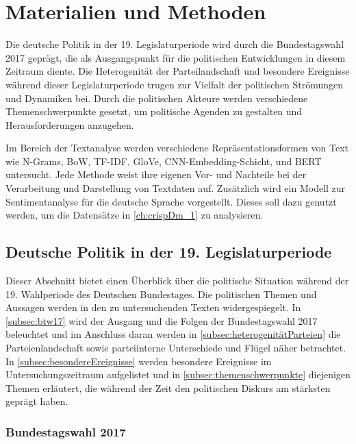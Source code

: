 
\chapter{Materialien und Methoden} \label{ch:materialsAndMethods}

Die deutsche Politik in der 19. Legislaturperiode wird durch die Bundestagswahl 2017 geprägt, die als Ausgangspunkt für die politischen Entwicklungen in diesem Zeitraum diente. Die Heterogenität der Parteilandschaft und besondere Ereignisse während dieser Legislaturperiode trugen zur Vielfalt der politischen Strömungen und Dynamiken bei. Durch die politischen Akteure werden verschiedene Themenschwerpunkte gesetzt, um politische Agenden zu gestalten und Herausforderungen anzugehen.

Im Bereich der Textanalyse werden verschiedene Repräsentationsformen von Text wie N-Grams, \ac{BoW}, \ac{TF-IDF}, \ac{GloVe}, \ac{CNN}-Embedding-Schicht, \ft und \ac{BERT} untersucht. Jede Methode weist ihre eigenen Vor- und Nachteile bei der Verarbeitung und Darstellung von Textdaten auf. Zusätzlich wird ein Modell zur Sentimentanalyse für die deutsche Sprache vorgestellt. Dieses soll dazu genutzt werden, um die Datensätze in \autoref{ch:crispDm_1} zu analysieren.

\section{Deutsche Politik in der 19. Legislaturperiode}

Dieser Abschnitt bietet einen Überblick über die politische Situation während der \num{19}. Wahlperiode des Deutschen Bundestages. Die politischen Themen und Aussagen werden in den zu untersuchenden Texten widergespiegelt. In \autoref{subsec:btw17} wird der Ausgang und die Folgen der Bundestagswahl \num{2017} beleuchtet und im Anschluss daran werden in \autoref{subsec:heterogenitätParteien} die Parteienlandschaft sowie parteiinterne Unterschiede und Flügel näher betrachtet. In \autoref{subsec:besondereEreignisse} werden besondere Ereignisse im Untersuchungszeitraum aufgelistet und in \autoref{subsec:themenschwerpunkte} diejenigen Themen erläutert, die während der Zeit den politischen Diskurs am stärksten geprägt haben.

\subsection{Bundestagswahl \num{2017}} \label{subsec:btw17}

